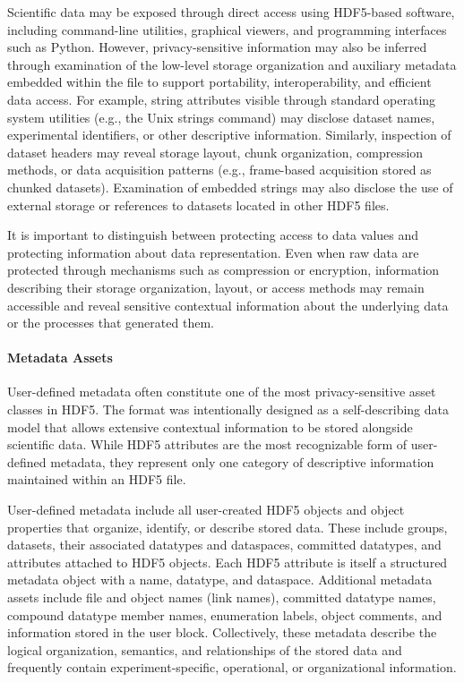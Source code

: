 \documentclass[../main.tex]{subfiles}
\begin{document}
Scientific data may be exposed through direct access using HDF5-based software, including 
command-line utilities, graphical viewers, and programming interfaces such as Python. 
However, privacy-sensitive information may also be inferred through examination of the low-level 
storage organization and auxiliary metadata embedded within the file to support portability, 
interoperability, and efficient data access. For example, string attributes visible through 
standard operating system utilities (e.g., the Unix strings command) may disclose dataset 
names, experimental identifiers, or other descriptive information. Similarly, inspection 
of dataset headers may reveal storage layout, chunk organization, compression methods, 
or data acquisition patterns (e.g., frame-based acquisition stored as chunked datasets). 
Examination of embedded strings may also disclose the use of external storage or references 
to datasets located in other HDF5 files.

It is important to distinguish between protecting access to data values and protecting 
information about data representation. Even when raw data are protected through mechanisms 
such as compression or encryption, information describing their storage organization, layout, 
or access methods may remain accessible and reveal sensitive contextual information about 
the underlying data or the processes that generated them.


\paragraph{Metadata Assets}

User-defined metadata often constitute one of the most privacy-sensitive asset classes in HDF5. 
The format was intentionally designed as a self-describing data model that allows extensive 
contextual information to be stored alongside scientific data. While HDF5 attributes are the most 
recognizable form of user-defined metadata, they represent only one category of descriptive 
information maintained within an HDF5 file.

User-defined metadata include all user-created HDF5 objects and object properties that organize, 
identify, or describe stored data. These include groups, datasets, their associated datatypes 
and dataspaces, committed datatypes, and attributes attached to HDF5 objects. 
Each HDF5 attribute is itself a structured metadata object with a name, datatype, and dataspace. 
Additional metadata assets include file and object names (link names), committed datatype names, 
compound datatype member names, enumeration labels, object comments, and information 
stored in the user block. Collectively, these metadata describe the logical organization, 
semantics, and relationships of the stored data and frequently contain experiment-specific, 
operational, or organizational information.
\end{document}
